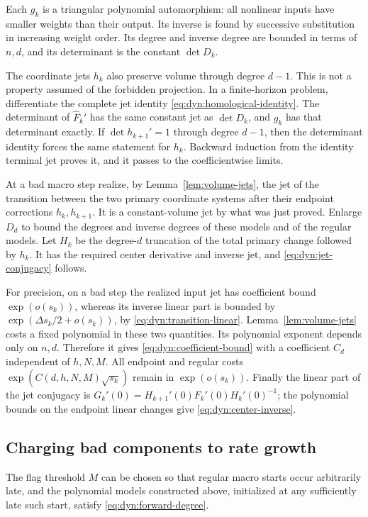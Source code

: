 Each $g_k$ is a triangular polynomial automorphism: all nonlinear
inputs have smaller weights than their output.  Its inverse is found
by successive substitution in increasing weight order.  Its degree
and inverse degree are bounded in terms of $n,d$, and its determinant
is the constant $\det D_k$.

The coordinate jets $h_k$ also preserve volume through degree $d-1$.
This is not a property assumed of the forbidden projection.  In a
finite-horizon problem, differentiate the complete jet identity
\eqref{eq:dyn:homological-identity}.  The determinant of
$\widehat F_k'$ has the same constant jet as $\det D_k$, and $g_k$ has
that determinant exactly.  If $\det h_{k+1}'=1$ through degree $d-1$,
then the determinant identity forces the same statement for $h_k$.
Backward induction from the identity terminal jet proves it, and it
passes to the coefficientwise limits.

At a bad macro step realize, by Lemma~\ref{lem:volume-jets}, the jet of
the transition between the two primary coordinate systems after their
endpoint corrections $h_k,h_{k+1}$.  It is a constant-volume jet by
what was just proved.  Enlarge $D_d$ to bound the degrees and inverse
degrees of these models and of the regular models.
Let $H_k$ be the degree-$d$ truncation of the total primary change
followed by $h_k$.  It has the required center derivative and inverse
jet, and \eqref{eq:dyn:jet-conjugacy} follows.

For precision, on a bad step the realized input jet has coefficient
bound $\exp(o(s_k))$, whereas its inverse linear part is bounded by
$\exp(\Delta s_k/2+o(s_k))$, by
\eqref{eq:dyn:transition-linear}.  Lemma~\ref{lem:volume-jets} costs a
fixed polynomial in these two quantities.  Its polynomial exponent
depends only on $n,d$.  Therefore it gives
\eqref{eq:dyn:coefficient-bound} with a coefficient $C_d$ independent
of $h,N,M$.  All endpoint and regular costs
$\exp(C(d,h,N,M)\sqrt{s_k})$ remain in $\exp(o(s_k))$.
Finally the linear part of the jet conjugacy is
$G_k'(0)=H_{k+1}'(0)F_k'(0)H_k'(0)^{-1}$; the polynomial bounds on the
endpoint linear changes give \eqref{eq:dyn:center-inverse}.

\subsection{Charging bad components to rate growth}

\begin{lemma}\label{lem:degree-control}
The flag threshold $M$ can be chosen so that regular macro starts
occur arbitrarily late, and the polynomial models constructed above,
initialized at any sufficiently late such start, satisfy
\eqref{eq:dyn:forward-degree}.
\end{lemma}


